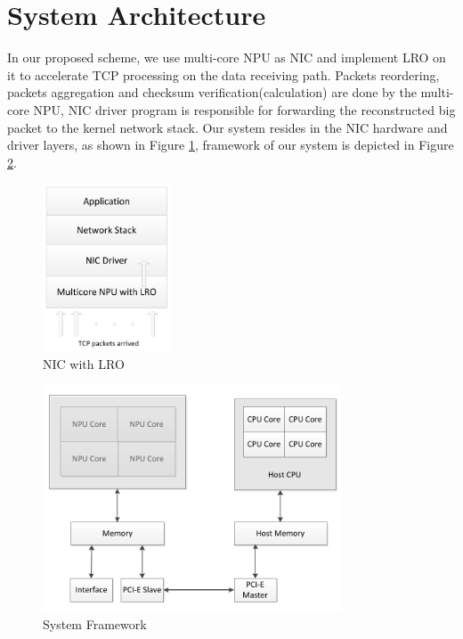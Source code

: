 \documentclass[conference]{IEEEtran}
\begin{document}
\section{System Architecture}
In our proposed scheme, we use multi-core NPU as NIC and implement LRO on it to accelerate TCP processing on the data receiving path. Packets reordering, packets aggregation and checksum verification(calculation) are done by the multi-core NPU, NIC driver program is responsible for forwarding the reconstructed big packet to the kernel network stack. Our system resides in the NIC hardware and driver layers, as shown in Figure \ref{nic_with_lro}, framework of our system is depicted in Figure \ref{system framework}.
\begin{figure}[!t]
\centering
\includegraphics[width=1.5in]{nic_with_lro}
\caption{NIC with LRO}
\label{nic_with_lro}
\end{figure}
\begin{figure}[!t]
\centering
\includegraphics[width=3.5in]{system_framework}
\caption{System Framework}
\label{system framework}
\end{figure}
\end{document}
